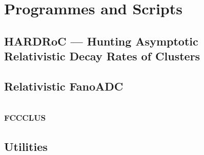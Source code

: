 \chapter{Programmes and Scripts}

\section{HARDRoC --- Hunting Asymptotic Relativistic Decay Rates of Clusters}
\section{Relativistic FanoADC}

\section{\textsc{fccclus}}
\section{Utilities}
